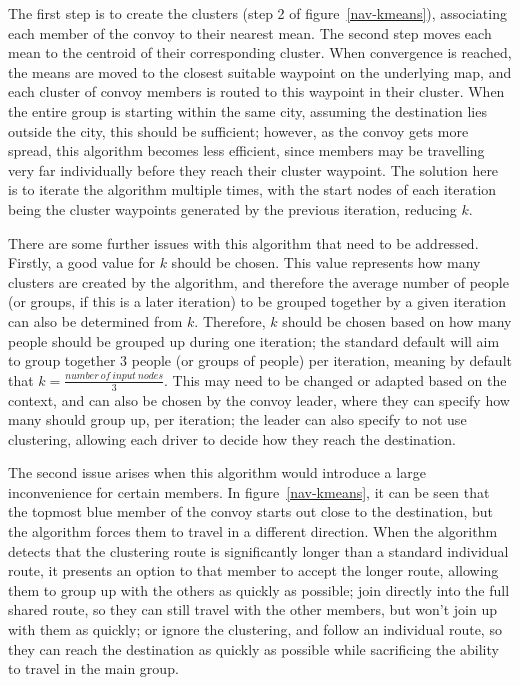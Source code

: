 \documentclass{article}
\begin{document}
The first step is to create the clusters (step 2 of figure~\ref{nav-kmeans}), associating each member of the convoy to their nearest mean. The second step moves each mean to the centroid of their corresponding cluster. When convergence is reached, the means are moved to the closest suitable waypoint on the underlying map, and each cluster of convoy members is routed to this waypoint in their cluster. When the entire group is starting within the same city, assuming the destination lies outside the city, this should be sufficient; however, as the convoy gets more spread, this algorithm becomes less efficient, since members may be travelling very far individually before they reach their cluster waypoint. The solution here is to iterate the algorithm multiple times, with the start nodes of each iteration being the cluster waypoints generated by the previous iteration, reducing $k$.

There are some further issues with this algorithm that need to be addressed. Firstly, a good value for $k$ should be chosen. This value represents how many clusters are created by the algorithm, and therefore the average number of people (or groups, if this is a later iteration) to be grouped together by a given iteration can also be determined from $k$. Therefore, $k$ should be chosen based on how many people should be grouped up during one iteration; the standard default will aim to group together 3
%
%
people (or groups of people) per iteration, meaning by default that $k=\frac{number\ of\ input\ nodes}{3}$. This may need to be changed or adapted based on the context, and can also be chosen by the convoy leader, where they can specify how many should group up, per iteration; the leader can also specify to not use clustering, allowing each driver to decide how they reach the destination.

The second issue arises when this algorithm would introduce a large inconvenience for certain members. In figure~\ref{nav-kmeans}, it can be seen that the topmost blue member of the convoy starts out close to the destination, but the algorithm forces them to travel in a different direction. When the algorithm detects that the clustering route is significantly longer than a standard individual route, it presents an option to that member to accept the longer route, allowing them to group up with the others as quickly as possible; join directly into the full shared route, so they can still travel with the other members, but won't join up with them as quickly; or ignore the clustering, and follow an individual route, so they can reach the destination as quickly as possible while sacrificing the ability to travel in the main group.
\end{document}
